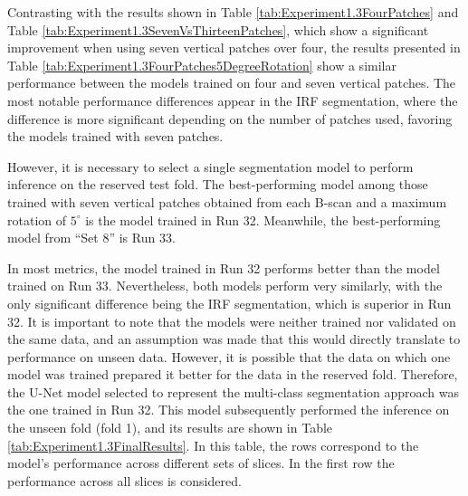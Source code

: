 Contrasting with the results shown in Table \ref{tab:Experiment1.3FourPatches} and Table \ref{tab:Experiment1.3SevenVsThirteenPatches}, which show a significant improvement when using seven vertical patches over four, the results presented in Table \ref{tab:Experiment1.3FourPatches5DegreeRotation} show a similar performance between the models trained on four and seven vertical patches. The most notable performance differences appear in the IRF segmentation, where the difference is more significant depending on the number of patches used, favoring the models trained with seven patches.
\par
However, it is necessary to select a single segmentation model to perform inference on the reserved test fold. The best-performing model among those trained with seven vertical patches obtained from each B-scan and a maximum rotation of $5^{\circ}$ is the model trained in Run 32. Meanwhile, the best-performing model from ``Set 8'' is Run 33.
\par
In most metrics, the model trained in Run 32 performs better than the model trained on Run 33. Nevertheless, both models perform very similarly, with the only significant difference being the IRF segmentation, which is superior in Run 32. It is important to note that the models were neither trained nor validated on the same data, and an assumption was made that this would directly translate to performance on unseen data. However, it is possible that the data on which one model was trained prepared it better for the data in the reserved fold. Therefore, the U-Net model selected to represent the multi-class segmentation approach was the one trained in Run 32. This model subsequently performed the inference on the unseen fold (fold 1), and its results are shown in Table \ref{tab:Experiment1.3FinalResults}. In this table, the rows correspond to the model's performance across different sets of slices. In the first row the performance across all slices is considered.

